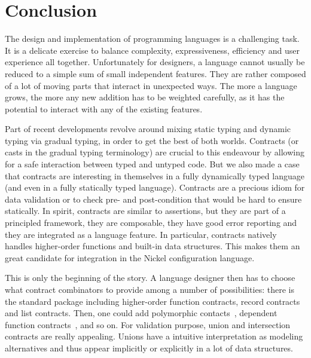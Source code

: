 \documentclass[sigplan,10pt,review,anonymous]{acmart}
\begin{document}
\section{Conclusion}
\label{sec:conclusion}

The design and implementation of programming languages is a challenging task. It
is a delicate exercise to balance complexity, expressiveness, efficiency and
user experience all together. Unfortunately for designers, a language cannot
usually be reduced to a simple sum of small independent features. They are
rather composed of a lot of moving parts that interact in unexpected ways. The
more a language grows, the more any new addition has to be weighted carefully,
as it has the potential to interact with any of the existing features.

Part of recent developments revolve around mixing static typing and dynamic
typing via gradual typing, in order to get the best of both worlds. Contracts
(or casts in the gradual typing terminology) are crucial to this endeavour by
allowing for a safe interaction between typed and untyped code. But we also made
a case that contracts are interesting in themselves in a fully dynamically typed
language (and even in a fully statically typed language).  Contracts are a
precious idiom for data validation or to check pre- and post-condition that
would be hard to ensure statically. In spirit, contracts are similar to
assertions, but they are part of a principled framework, they are composable,
they have good error reporting and they are integrated as a language feature. In
particular, contracts natively handles higher-order functions and built-in data
structures. This makes them an great candidate for integration in the Nickel
configuration language.

This is only the beginning of the story. A language designer then has to choose
what contract combinators to provide among a number of possibilities: there is
the standard package including higher-order function contracts, record contracts
and list contracts.  Then, one could add polymorphic
contacts~\cite{BlameForAll}, dependent function
contracts~\cite{DependentContracts}, and so on. For validation purpose, union and
intersection contracts are really appealing. Unions have a intuitive
interpretation as modeling alternatives and thus appear implicitly or explicitly
in a lot of data structures.
\end{document}
